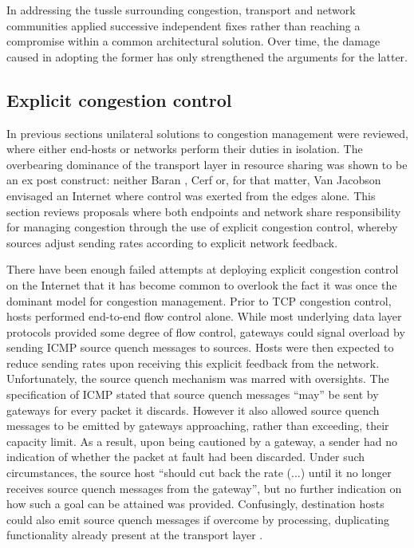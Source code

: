 In addressing the tussle surrounding congestion, transport and network communities applied successive independent fixes rather than reaching a compromise within a common architectural solution.
Over time, the damage caused in adopting the former has only strengthened the arguments for the latter.

\subsection{Explicit congestion control}
\label{sec:resourcepooling:xcc}

In previous sections unilateral solutions to congestion management were reviewed, where either end-hosts or networks perform their duties in isolation. 
The overbearing dominance of the transport layer in resource sharing was shown to be an ex post construct:
neither Baran \cite{Baran:1964p453}, Cerf \cite{Cerf:2005p452} or, for that matter, Van Jacobson \cite{Jacobson:1988p398} envisaged an Internet where control was exerted from the edges alone.
This section reviews proposals where both endpoints and network share responsibility for managing congestion through the use of explicit congestion control, whereby sources adjust sending rates according to explicit network feedback.

There have been enough failed attempts at deploying explicit congestion control on the Internet that it has become common to overlook the fact it was once the dominant model for congestion management.
Prior to \ac{TCP} congestion control, hosts performed end-to-end flow control alone. 
While most underlying data layer protocols provided some degree of flow control, gateways could signal overload by sending \ac{ICMP} source quench messages to sources.
Hosts were then expected to reduce sending rates upon receiving this explicit feedback from the network.
Unfortunately, the source quench mechanism was marred with oversights.
The specification of \acs{ICMP}\cite{Postel:1981p463} stated that source quench messages ``may'' be sent by gateways for every packet it discards.
However it also allowed source quench messages to be emitted by gateways approaching, rather than exceeding, their capacity limit.
As a result, upon being cautioned by a gateway, a sender had no indication of whether the packet at fault had been discarded.
Under such circumstances, the source host ``should cut back the rate (...) until it no longer receives source quench messages from the gateway'',
but no further indication on how such a goal can be attained was provided.
Confusingly, destination hosts could also emit source quench messages if overcome by processing, duplicating functionality already present at the transport layer \cite{Postel:1980p445}.


